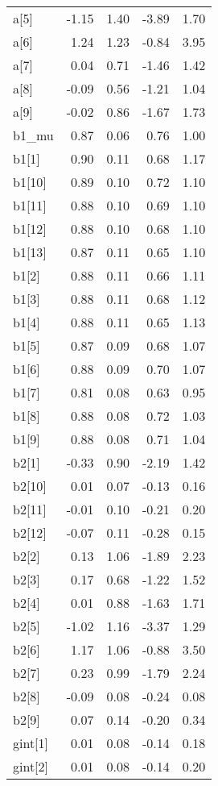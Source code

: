 \documentclass[12pt,]{article}
\begin{document}
\begin{table}[ht]
{\begin{tabular}{lrrrr}
  a[5] & -1.15 & 1.40 & -3.89 & 1.70 \\ 
  a[6] & 1.24 & 1.23 & -0.84 & 3.95 \\ 
  a[7] & 0.04 & 0.71 & -1.46 & 1.42 \\ 
  a[8] & -0.09 & 0.56 & -1.21 & 1.04 \\ 
  a[9] & -0.02 & 0.86 & -1.67 & 1.73 \\ 
  b1\_mu & 0.87 & 0.06 & 0.76 & 1.00 \\ 
  b1[1] & 0.90 & 0.11 & 0.68 & 1.17 \\ 
  b1[10] & 0.89 & 0.10 & 0.72 & 1.10 \\ 
  b1[11] & 0.88 & 0.10 & 0.69 & 1.10 \\ 
  b1[12] & 0.88 & 0.10 & 0.68 & 1.10 \\ 
  b1[13] & 0.87 & 0.11 & 0.65 & 1.10 \\ 
  b1[2] & 0.88 & 0.11 & 0.66 & 1.11 \\ 
  b1[3] & 0.88 & 0.11 & 0.68 & 1.12 \\ 
  b1[4] & 0.88 & 0.11 & 0.65 & 1.13 \\ 
  b1[5] & 0.87 & 0.09 & 0.68 & 1.07 \\ 
  b1[6] & 0.88 & 0.09 & 0.70 & 1.07 \\ 
  b1[7] & 0.81 & 0.08 & 0.63 & 0.95 \\ 
  b1[8] & 0.88 & 0.08 & 0.72 & 1.03 \\ 
  b1[9] & 0.88 & 0.08 & 0.71 & 1.04 \\ 
  b2[1] & -0.33 & 0.90 & -2.19 & 1.42 \\ 
  b2[10] & 0.01 & 0.07 & -0.13 & 0.16 \\ 
  b2[11] & -0.01 & 0.10 & -0.21 & 0.20 \\ 
  b2[12] & -0.07 & 0.11 & -0.28 & 0.15 \\ 
  b2[2] & 0.13 & 1.06 & -1.89 & 2.23 \\ 
  b2[3] & 0.17 & 0.68 & -1.22 & 1.52 \\ 
  b2[4] & 0.01 & 0.88 & -1.63 & 1.71 \\ 
  b2[5] & -1.02 & 1.16 & -3.37 & 1.29 \\ 
  b2[6] & 1.17 & 1.06 & -0.88 & 3.50 \\ 
  b2[7] & 0.23 & 0.99 & -1.79 & 2.24 \\ 
  b2[8] & -0.09 & 0.08 & -0.24 & 0.08 \\ 
  b2[9] & 0.07 & 0.14 & -0.20 & 0.34 \\ 
  gint[1] & 0.01 & 0.08 & -0.14 & 0.18 \\ 
  gint[2] & 0.01 & 0.08 & -0.14 & 0.20 \\ 

\end{tabular}}
\end{table}
\end{document}
